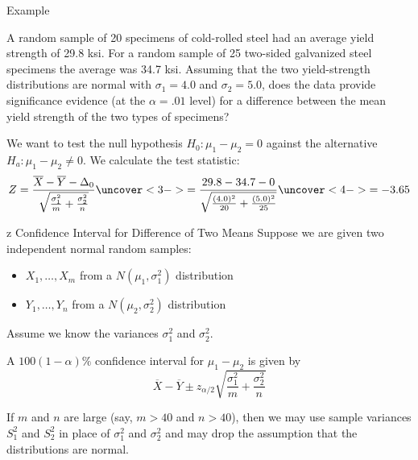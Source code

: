 \documentclass[handout]{beamer}
\begin{document}
\begin{frame}{Example}
\begin{block}{}
A random sample of 20 specimens of cold-rolled steel had an average yield strength of 29.8 ksi. For a random sample of 25 two-sided galvanized steel specimens the average was 34.7 ksi. Assuming that the two yield-strength distributions are normal with $\sigma_1=4.0$ and $\sigma_2=5.0$, does the data provide significance evidence (at the $\alpha=.01$ level) for a difference between the mean yield strength of the two types of specimens?
\end{block}

\pause We want to test the null hypothesis $H_0: \mu_1-\mu_2=0$ against the alternative $H_a: \mu_1-\mu_2\neq 0$. \pause We calculate the test statistic:
$$Z=\frac{\overline X-\overline Y-\Delta_0}{\sqrt{\frac{\sigma_1^2}m+\frac{\sigma_2^2}n}}
\uncover<3->{= \frac{29.8-34.7-0}{\sqrt{\frac{(4.0)^2}{20}+\frac{(5.0)^2}{25}}}}
\uncover<4->{=-3.65}$$

\end{frame}

\begin{frame}{z Confidence Interval for Difference of Two Means}
Suppose we are given two independent normal random samples:
\begin{itemize}
\item $X_1,\dots,X_m$ from a $N(\mu_1,\sigma_1^2)$ distribution
\item $Y_1,\dots,Y_n$ from a $N(\mu_2,\sigma_2^2)$ distribution
\end{itemize}
\pause Assume we know the variances $\sigma_1^2$ and $\sigma_2^2$.
\pause \begin{block}{}
A $100(1-\alpha)\%$ confidence interval for $\mu_1-\mu_2$ is given by
$$\overline{X} - \overline{Y} \pm z_{\alpha/2}\sqrt{\frac{\sigma_1^2}m+\frac{\sigma_2^2}n}$$
\end{block}
\pause If $m$ and $n$ are large (say, $m>40$ and $n>40$), then we may use sample variances $S_1^2$ and $S_2^2$ in place of $\sigma_1^2$ and $\sigma_2^2$ and may drop the assumption that the distributions are normal.
\end{frame}
\end{document}
